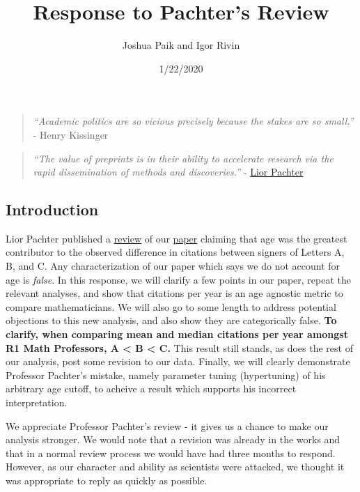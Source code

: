 \documentclass[]{article}
\title{Response to Pachter's Review}
\author{Joshua Paik and Igor Rivin}
\date{1/22/2020}
\begin{document}
\maketitle

{
\setcounter{tocdepth}{2}
\tableofcontents
}
\begin{quote}
\emph{``Academic politics are so vicious precisely because the stakes
are so small.''} - Henry Kissinger
\end{quote}

\begin{quote}
\emph{``The value of preprints is in their ability to accelerate
research via the rapid dissemination of methods and discoveries.''} -
\href{https://liorpachter.wordpress.com/2019/10/21/zero-data-rna-seq/}{Lior
Pachter}
\end{quote}

\hypertarget{introduction}{%
\subsection{Introduction}\label{introduction}}

Lior Pachter published a
\href{https://liorpachter.wordpress.com/2020/01/17/diversity-matters/}{review}
of our \href{https://arxiv.org/pdf/2001.00670.pdf}{paper} claiming that
age was the greatest contributor to the observed difference in citations
between signers of Letters A, B, and C. Any characterization of our
paper which says we do not account for age is \emph{false}. In this
response, we will clarify a few points in our paper, repeat the relevant
analyses, and show that citations per year is an age agnostic metric to
compare mathematicians. We will also go to some length to address
potential objections to this new analysis, and also show they are
categorically false. \textbf{To clarify, when comparing mean and median
citations per year amongst R1 Math Professors, A \textless{} B
\textless{} C.} This result still stands, as does the rest of our
analysis, post some revision to our data. Finally, we will clearly
demonstrate Professor Pachter's mistake, namely parameter tuning
(hypertuning) of his arbitrary age cutoff, to acheive a result which
supports his incorrect interpretation.

We appreciate Professor Pachter's review - it gives us a chance to make
our analysis stronger. We would note that a revision was already in the
works and that in a normal review process we would have had three months
to respond. However, as our character and ability as scientists were
attacked, we thought it was appropriate to reply as quickly as possible.
\end{document}
